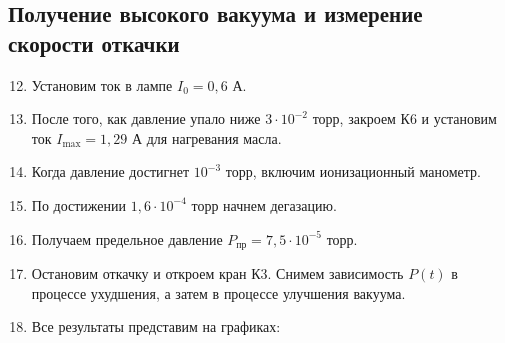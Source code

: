 \documentclass[a4paper,12pt]{article}
\begin{document}
 \subsection{Получение высокого вакуума и измерение скорости откачки}
    \begin{enumerate}
        \setcounter{enumi}{11}
        \item Установим ток в лампе $I_0 = 0{,}6$ А.
        \item После того, как давление упало ниже $3\cdot 10^{-2}$ торр,
        закроем К6 и установим ток $I_{\text{max}} = 1{,}29$ А для нагревания
        масла.
        \item Когда давление достигнет $10^{-3}$ торр, включим ионизационный
        манометр.
        \item По достижении $1{,}6\cdot 10^{-4}$ торр начнем дегазацию.
        \item Получаем предельное давление $P_{\text{пр}} = 7{,}5\cdot 10^{-5}$
        торр.
        \item Остановим откачку и откроем кран К3. Снимем зависимость $P(t)$
        в процессе ухудшения, а затем в процессе улучшения вакуума.
        \item Все результаты представим на графиках:


\end{enumerate}
\end{document}
